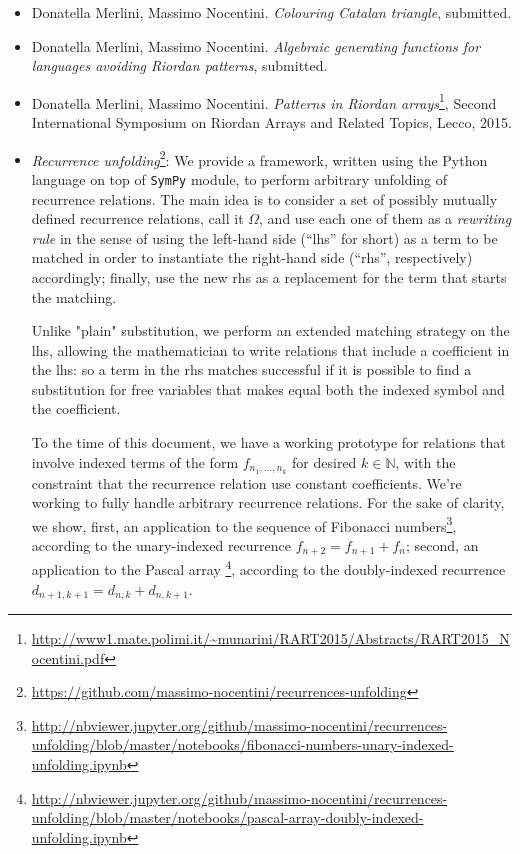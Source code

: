 \documentclass[10pt,a4paper]{scrartcl}
\begin{document}
    \begin{itemize}

        \item Donatella Merlini, Massimo Nocentini. \emph{Colouring Catalan triangle}, submitted.

        \item Donatella Merlini, Massimo Nocentini. \emph{Algebraic generating functions for languages
            avoiding Riordan patterns}, submitted.

        \item Donatella Merlini, Massimo Nocentini. \emph{Patterns in Riordan arrays}\footnote{\url{http://www1.mate.polimi.it/~munarini/RART2015/Abstracts/RART2015_Nocentini.pdf}}, 
            Second International Symposium on Riordan Arrays and Related Topics, Lecco, 2015.

        \item \emph{Recurrence unfolding}\footnote{\url{https://github.com/massimo-nocentini/recurrences-unfolding}}: 
            We provide a framework, written using the Python language
            on top of \texttt{SymPy} module, to perform arbitrary unfolding of recurrence relations. The main idea
            is to consider a set of possibly mutually defined recurrence relations, call it $\Omega$, and use each
            one of them as a \emph{rewriting rule} in the sense of using the left-hand side (``lhs'' for short) 
            as a term to be matched in order to instantiate the right-hand side (``rhs'', respectively) accordingly; 
            finally, use the new rhs as a replacement for the term that starts the matching. 

            Unlike "plain" substitution, we perform an extended matching strategy on the lhs, 
            allowing the mathematician to write relations that include a coefficient in the lhs: so a term in the rhs
            matches successful if it is possible to find a substitution for free variables that makes equal both
            the indexed symbol and the coefficient.

            To the time of this document, we have a working prototype for relations that involve indexed terms of the
            form $f_{n_{1}, \ldots, n_{k}}$ for desired $k\in\mathbb{N}$, with the constraint that the recurrence relation 
            use constant coefficients. We're working to fully handle arbitrary recurrence relations. For the sake of 
            clarity, we show, first, an application to the sequence of Fibonacci numbers\footnote{\url{http://nbviewer.jupyter.org/github/massimo-nocentini/recurrences-unfolding/blob/master/notebooks/fibonacci-numbers-unary-indexed-unfolding.ipynb}},
            according to the unary-indexed recurrence $f_{n+2}=f_{n+1}+f_{n}$; second, an application to the Pascal array
            \footnote{\url{http://nbviewer.jupyter.org/github/massimo-nocentini/recurrences-unfolding/blob/master/notebooks/pascal-array-doubly-indexed-unfolding.ipynb}},
            according to the doubly-indexed recurrence $d_{n+1,k+1} = d_{n,k}+d_{n,k+1}$.


\end{itemize}
\end{document}
